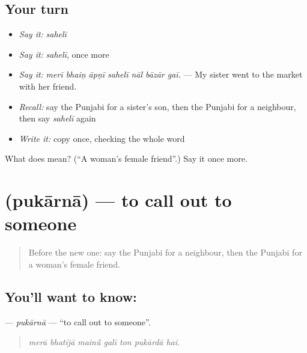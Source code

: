 \subsection*{Your turn}
\begin{itemize}
\raggedright
  \item \emph{Say it:} \emph{sahelī}
  \item \emph{Say it:} \emph{sahelī}, once more
  \item \emph{Say it:} \emph{merī bhaiṇ āpṇī sahelī nāl bāzār gaī.} — My sister went to the market with her friend.
  \item \emph{Recall:} say the Punjabi for a sister's son, then the Punjabi for a neighbour, then say \emph{sahelī} again
  \item \emph{Write it:} copy \textbf{} once, checking the whole word
\end{itemize}

\begin{tcolorbox}[breakable,colback=teal!4,colframe=teal!35!black,title={Before you move on}]
What does  mean? (\textquotedblleft{}A woman's female friend\textquotedblright{}.) Say it once more.
\end{tcolorbox}
\section[\texorpdfstring{\pa{ਪੁਕਾਰਨਾ} (pukārnā)}{ਪੁਕਾਰਨਾ (pukārnā)}]{ (pukārnā) — to call out to someone}

\label{lesson:PA-C332-pukarna}



\begin{quote}
Before the new one: say the Punjabi for a neighbour, then the Punjabi for a woman's female friend.
\end{quote}

\subsection*{You'll want to know: }
\textbf{} — \emph{pukārnā} — \textquotedblleft{}to call out to someone\textquotedblright{}.

\begin{quote}
      
\end{quote}

\begin{quote}
\emph{merā bhatījā mainū̃ galī ton pukārdā hai.}
\end{quote}


